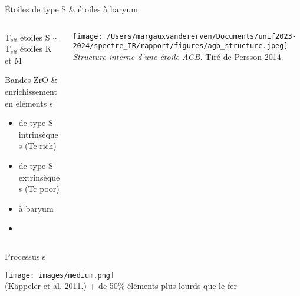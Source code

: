 \documentclass[10pt]{beamer}
\subtitle{Étude de spectres infrarouges de géantes rouges évoluées}
\date{}
\author{\small Margaux Vandererven}
\institute{\small Supervisé par Sophie Van Eck}
\begin{document}
\maketitle


\begin{frame}[fragile]{Étoiles de type S \& étoiles à baryum}

    \begin{columns}
            \begin{column}{0.6\textwidth}
                    T$_{\text{eff}}$ étoiles S $\sim$ T$_{\text{eff}}$ étoiles K et M 

                    Bandes ZrO \& enrichissement en éléments s

    					\begin{itemize}
    						\item de type S intrinsèques (Tc rich)
    						\item de type S extrinsèques (Tc poor)
    						\item à baryum
    						\item[] 
    					\end{itemize} 
            \end{column}
            \begin{column}{0.4\textwidth}
                \centering
                \texttt{[image: /Users/margauxvandererven/Documents/unif2023-2024/spectre\_IR/rapport/figures/agb\_structure.jpeg]}
    			\textit{Structure interne d'une étoile AGB.} Tiré de Persson 2014.
            \end{column}
    \end{columns}
\end{frame}

\begin{frame}[fragile]{Processus s}

    \begin{center}
        \texttt{[image: images/medium.png]} \\
        (Käppeler et al. 2011.)
        \vfill
        + de 50\% éléments plus lourds que le fer \\
    \end{center}
\end{frame}
\end{document}
